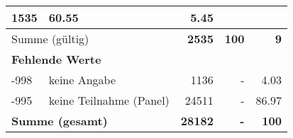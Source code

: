 \begin{longtable}{lXrrr}
       \num{1535} &
       \num[round-mode=places,round-precision=2]{60,55} &
         \num[round-mode=places,round-precision=2]{5,45} \\
     \midrule
     \multicolumn{2}{l}{Summe (gültig)} &
       \textbf{\num{2535}} &
     \textbf{100} &
       \textbf{\num[round-mode=places,round-precision=2]{9}} \\
     \multicolumn{5}{l}{\textbf{Fehlende Werte}}\\
       -998 &
       keine Angabe &
         \num{1136} &
        - &
         \num[round-mode=places,round-precision=2]{4,03} \\
       -995 &
       keine Teilnahme (Panel) &
         \num{24511} &
        - &
         \num[round-mode=places,round-precision=2]{86,97} \\
     \midrule
     \multicolumn{2}{l}{\textbf{Summe (gesamt)}} &
          \textbf{\num{28182}} &
        \textbf{-} &
        \textbf{100} \\
     \bottomrule
     \end{longtable}
     
